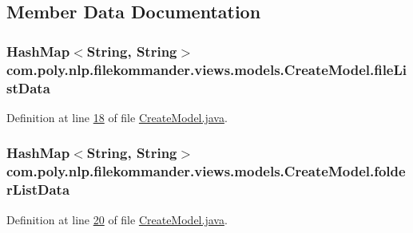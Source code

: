 \subsection{Member Data Documentation}
\hypertarget{classcom_1_1poly_1_1nlp_1_1filekommander_1_1views_1_1models_1_1_create_model_ab7b2c78de5e244603bf942be06d1aa82}{
\subsubsection[{file\-List\-Data}]{\setlength{\rightskip}{0pt plus 5cm}Hash\-Map$<$String, String$>$ com.\-poly.\-nlp.\-filekommander.\-views.\-models.\-Create\-Model.\-file\-List\-Data\hspace{0.3cm}{\ttfamily [private]}}}\label{classcom_1_1poly_1_1nlp_1_1filekommander_1_1views_1_1models_1_1_create_model_ab7b2c78de5e244603bf942be06d1aa82}


Definition at line \hyperlink{L18}{18} of file \hyperlink{}{Create\-Model.\-java}.

\hypertarget{classcom_1_1poly_1_1nlp_1_1filekommander_1_1views_1_1models_1_1_create_model_a4ffeca4b461f31e7024727e67ed4f0cf}{
\subsubsection[{folder\-List\-Data}]{\setlength{\rightskip}{0pt plus 5cm}Hash\-Map$<$String, String$>$ com.\-poly.\-nlp.\-filekommander.\-views.\-models.\-Create\-Model.\-folder\-List\-Data\hspace{0.3cm}{\ttfamily [private]}}}\label{classcom_1_1poly_1_1nlp_1_1filekommander_1_1views_1_1models_1_1_create_model_a4ffeca4b461f31e7024727e67ed4f0cf}


Definition at line \hyperlink{L20}{20} of file \hyperlink{}{Create\-Model.\-java}.

